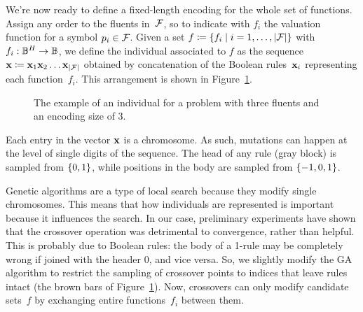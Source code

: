 We're now ready to define a fixed-length encoding for the whole set of
functions. Assign any order to the fluents in~$\mathcal{F}$, so to indicate with
$f_i$ the valuation function for a symbol $p_i \in \mathcal{F}$. Given a
set $f \coloneqq \{f_i \mid i=1, \dots, \lvert\mathcal{F}\rvert\}$ with $f_i: \mathbb{B}^H
\to \mathbb{B}$, we define the individual associated to $f$ as the sequence $\mathbf{x}
\coloneqq \mathbf{x}_1 \mathbf{x}_2 \dots \mathbf{x}_{\lvert\mathcal{F}\rvert}$ obtained by concatenation of
the Boolean rules~$\mathbf{x}_i$ representing each function~$f_i$. This arrangement is
shown in Figure~\ref{fig:ga-encoding}.
\begin{figure}
	\centering
	\caption{The example of an individual for a problem with three fluents and
	an encoding size of 3.}
	\label{fig:ga-encoding}
\end{figure}
Each entry in the vector $\mathbf{x}$ is a chromosome. As such, mutations can happen
at the level of single digits of the sequence. The head of any rule (gray
block) is sampled from $\{0, 1\}$, while positions in the body are sampled
from $\{-1, 0, 1\}$.

Genetic algorithms are a type of local search because they modify single
chromosomes. This means that how individuals are represented is important
because it influences the search. In our case, preliminary experiments have
shown that the crossover operation was detrimental to convergence, rather than
helpful. This is probably due to Boolean rules: the body of a 1-rule may be
completely wrong if joined with the header 0, and vice versa. So, we slightly
modify the GA algorithm to restrict the sampling of crossover points to
indices that leave rules intact (the brown bars of
Figure~\ref{fig:ga-encoding}). Now, crossovers can only modify candidate
sets~$f$ by exchanging entire functions~$f_i$ between them.

